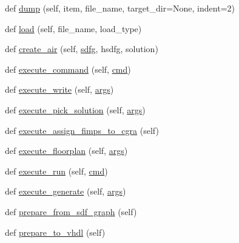 \begin{DoxyCompactItemize}
\item 
def \hyperlink{classsylva_1_1misc_1_1exec_1_1_s_y_l_v_a_a069be4000eb357f5b2088f408ded6ef0}{dump} (self, item, file\+\_\+name, target\+\_\+dir=None, indent=2)
\item 
def \hyperlink{classsylva_1_1misc_1_1exec_1_1_s_y_l_v_a_a848ae0b83bbf7a02a22b2958dd1388f8}{load} (self, file\+\_\+name, load\+\_\+type)
\item 
def \hyperlink{classsylva_1_1misc_1_1exec_1_1_s_y_l_v_a_a0fb6646b35fdfc07ca05bb2435e4d117}{create\+\_\+air} (self, \hyperlink{classsylva_1_1base_1_1sdf_1_1sdfg}{sdfg}, hsdfg, solution)
\item 
def \hyperlink{classsylva_1_1misc_1_1exec_1_1_s_y_l_v_a_a6e8ae0e377770a6669d6c9544b7b55db}{execute\+\_\+command} (self, \hyperlink{namespacesylva_1_1misc_1_1exec_a49db5f46508c96872b9fd91c17271a25}{cmd})
\item 
def \hyperlink{classsylva_1_1misc_1_1exec_1_1_s_y_l_v_a_a395e3cd0c375c051762dd035dbbfe9b4}{execute\+\_\+write} (self, \hyperlink{namespacesylva_1_1misc_1_1exec_a4e70593929af3f6aa7fa94d0b4318766}{args})
\item 
def \hyperlink{classsylva_1_1misc_1_1exec_1_1_s_y_l_v_a_a06ccbb90cddd35e6f7c037bbc5148e93}{execute\+\_\+pick\+\_\+solution} (self, \hyperlink{namespacesylva_1_1misc_1_1exec_a4e70593929af3f6aa7fa94d0b4318766}{args})
\item 
def \hyperlink{classsylva_1_1misc_1_1exec_1_1_s_y_l_v_a_ae0feb4c294c27982ca22fcae8bd040f8}{execute\+\_\+assign\+\_\+fimps\+\_\+to\+\_\+cgra} (self)
\item 
def \hyperlink{classsylva_1_1misc_1_1exec_1_1_s_y_l_v_a_ad398d309b523adda00dcb7929c568e65}{execute\+\_\+floorplan} (self, \hyperlink{namespacesylva_1_1misc_1_1exec_a4e70593929af3f6aa7fa94d0b4318766}{args})
\item 
def \hyperlink{classsylva_1_1misc_1_1exec_1_1_s_y_l_v_a_ab4675d585d77d48f755842f22f9f845a}{execute\+\_\+run} (self, \hyperlink{namespacesylva_1_1misc_1_1exec_a49db5f46508c96872b9fd91c17271a25}{cmd})
\item 
def \hyperlink{classsylva_1_1misc_1_1exec_1_1_s_y_l_v_a_a11805867dcb2df10927531d78d9c26ca}{execute\+\_\+generate} (self, \hyperlink{namespacesylva_1_1misc_1_1exec_a4e70593929af3f6aa7fa94d0b4318766}{args})
\item 
def \hyperlink{classsylva_1_1misc_1_1exec_1_1_s_y_l_v_a_a67e8f5e9056dc12db86331eb50494e7c}{prepare\+\_\+from\+\_\+sdf\+\_\+graph} (self)
\item 
def \hyperlink{classsylva_1_1misc_1_1exec_1_1_s_y_l_v_a_a01eb55c566fcdf14c0aef3361b49f38d}{prepare\+\_\+to\+\_\+vhdl} (self)

\end{DoxyCompactItemize}

